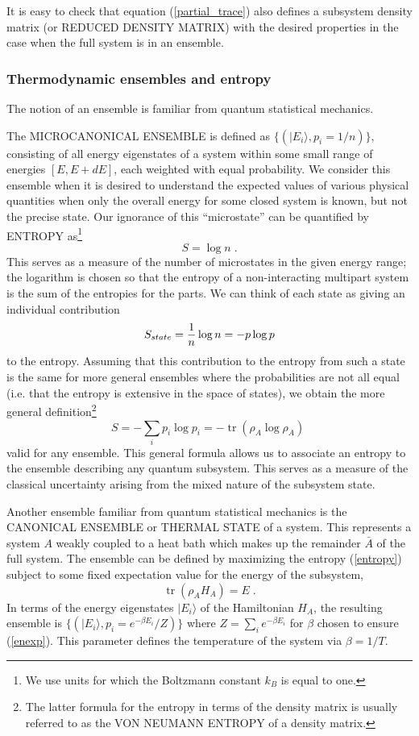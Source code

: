 \documentclass[12pt,epsf]{article}
\newcommand{\be}{\begin{equation}}
\newcommand{\ee}{\end{equation}}
\newcommand{\tr}{\operatorname{tr}}
\begin{document}
It is easy to check that equation (\ref{partial_trace}) also defines a subsystem density matrix (or REDUCED DENSITY MATRIX) with the desired properties in the case when the full system is in an ensemble.

\subsubsection*{Thermodynamic ensembles and entropy}

The notion of an ensemble is familiar from quantum statistical mechanics.

The MICROCANONICAL ENSEMBLE is defined as $\{(|E_i \rangle, p_i = 1/n)\}$, consisting of all energy eigenstates of a system within some small range of energies $[E, E + dE]$, each weighted with equal probability. We consider this ensemble when it is desired to understand the expected values of various physical quantities when only the overall energy for some closed system is known, but not the precise state. Our ignorance of this ``microstate'' can be quantified by ENTROPY as\footnote{We use units for which the Boltzmann constant $k_B$ is equal to one.}
\be
S = \log n \; .
\ee
This serves as a measure of the number of microstates in the given energy range; the logarithm is chosen so that the entropy of a non-interacting multipart system is the sum of the entropies for the parts. We can think of each state as giving an individual contribution
\be
S_{state} = {1 \over n} \log n = - p \log p
\ee
to the entropy. Assuming that this contribution to the entropy from such a state is the same for more general ensembles where the probabilities are not all equal (i.e. that the entropy is extensive in the space of states), we obtain the more general definition\footnote{The latter formula for the entropy in terms of the density matrix is usually referred to as the VON NEUMANN ENTROPY of a density matrix.}
\be
\label{entropy}
S = - \sum_i p_i \log p_i = -\tr(\rho_A \log \rho_A)\;
\ee
valid for any ensemble. This general formula allows us to associate an entropy to the ensemble describing any quantum subsystem. This serves as a measure of the classical uncertainty arising from the mixed nature of the subsystem state.

Another ensemble familiar from quantum statistical mechanics is the CANONICAL ENSEMBLE or THERMAL STATE of a system. This represents a system $A$ weakly coupled to a heat bath which makes up the remainder $\bar{A}$ of the full system. The ensemble can be defined by maximizing the entropy (\ref{entropy}) subject to some fixed expectation value for the energy of the subsystem,
\be
\label{enexp}
\tr(\rho_A H_A) = E \; .
\ee
In terms of the energy eigenstates $|E_i \rangle$ of the Hamiltonian $H_A$, the resulting ensemble is $\{(|E_i \rangle, p_i = e^{-\beta E_i}/Z)\}$ where $Z = \sum_i e^{-\beta E_i}$ for $\beta$ chosen to ensure (\ref{enexp}). This parameter defines the temperature of the system via $\beta = 1/T$.
\end{document}
